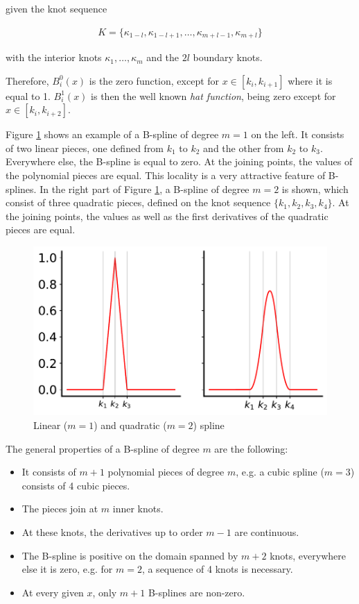 \documentclass[10pt,a4paper]{report}
\begin{document}
given the knot sequence 

\begin{align}\label{eq:knot_sequence}
	K = \{\kappa_{1-l}, \kappa_{1-l+1}, \dots, \kappa_{m+l-1}, \kappa_{m+l}\}
\end{align}

with the interior knots $\kappa_1, \dots, \kappa_m$ and the $2l$ boundary knots. \cite{fahrmeir2013regression}

Therefore, $B_i^0(x)$ is the zero function, except for $x \in [k_i, k_{i+1}]$ where it is equal to 1. $B_i^1(x)$ is then the well known \emph{hat function}, being zero except for $x \in [k_i, k_{i+2}]$. 

Figure \ref{fig:lin_and_quad_spline} shows an example of a B-spline of degree $m=1$ on the left. It consists of two linear pieces, one defined from $k_1$ to $k_2$ and the other from $k_2$ to $k_3$. Everywhere else, the B-spline is equal to zero. At the joining points, the values of the polynomial pieces are equal. This locality is a very attractive feature of B-splines. In the right part of Figure \ref{fig:lin_and_quad_spline}, a B-spline of degree $m=2$ is shown, which consist of three quadratic pieces, defined on the knot sequence $\{k_1, k_2, k_3, k_4\}$. At the joining points, the values as well as the first derivatives of the quadratic pieces are equal. 

\begin{figure}[H] 
	\centering
	\includegraphics[width=0.8\columnwidth]{../thesisplots/linear_and_quadratic_spline.pdf}
	\caption{Linear ($m=1$) and quadratic ($m=2$) spline}
	\label{fig:lin_and_quad_spline}
\end{figure}

The general properties of a B-spline of degree $m$ are the following:

\begin{itemize}
	\item It consists of $m+1$ polynomial pieces of degree $m$, e.g. a cubic spline ($m=3$) consists of 4 cubic pieces.
	\item The pieces join at $m$ inner knots.
	\item At these knots, the derivatives up to order $m-1$ are continuous.
	\item The B-spline is positive on the domain spanned by $m+2$ knots, everywhere else it is zero, e.g. for $m=2$, a sequence of 4 knots is necessary.
	\item At every given $x$, only $m+1$ B-splines are non-zero.
\end{itemize}
\end{document}
